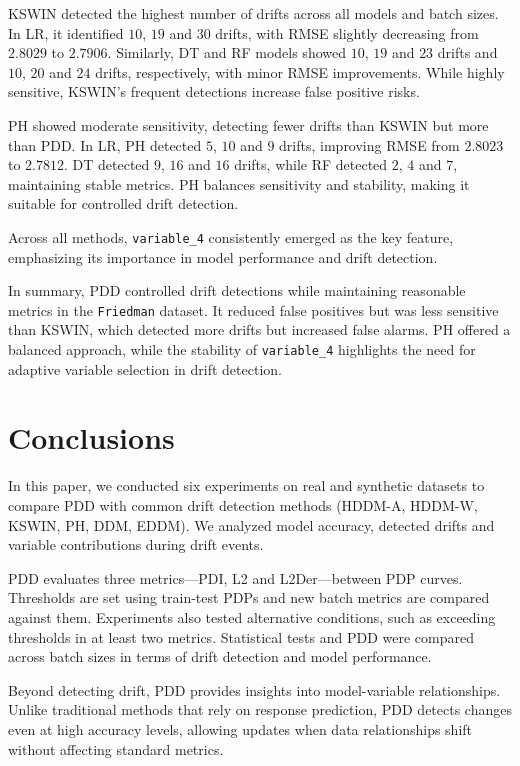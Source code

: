 KSWIN detected the highest number of drifts across all models and batch sizes. In LR, it identified \(10\), \(19\) and \(30\) drifts, with RMSE slightly decreasing from \(2.8029\) to \(2.7906\). Similarly, DT and RF models showed \(10\), \(19\) and \(23\) drifts and \(10\), \(20\) and \(24\) drifts, respectively, with minor RMSE improvements. While highly sensitive, KSWIN's frequent detections increase false positive risks.

PH showed moderate sensitivity, detecting fewer drifts than KSWIN but more than PDD. In LR, PH detected \(5\), \(10\) and \(9\) drifts, improving RMSE from \(2.8023\) to \(2.7812\). DT detected \(9\), \(16\) and \(16\) drifts, while RF detected \(2\), \(4\) and \(7\), maintaining stable metrics. PH balances sensitivity and stability, making it suitable for controlled drift detection.

Across all methods, \texttt{variable\_4} consistently emerged as the key feature, emphasizing its importance in model performance and drift detection.

In summary, PDD controlled drift detections while maintaining reasonable metrics in the \texttt{Friedman} dataset. It reduced false positives but was less sensitive than KSWIN, which detected more drifts but increased false alarms. PH offered a balanced approach, while the stability of \texttt{variable\_4} highlights the need for adaptive variable selection in drift detection.

\hypertarget{conclusions}{%
\section{Conclusions}\label{conclusions}}

In this paper, we conducted six experiments on real and synthetic datasets to compare PDD with common drift detection methods (HDDM-A, HDDM-W, KSWIN, PH, DDM, EDDM). We analyzed model accuracy, detected drifts and variable contributions during drift events.

PDD evaluates three metrics---PDI, L2 and L2Der---between PDP curves. Thresholds are set using train-test PDPs and new batch metrics are compared against them. Experiments also tested alternative conditions, such as exceeding thresholds in at least two metrics. Statistical tests and PDD were compared across batch sizes in terms of drift detection and model performance.

Beyond detecting drift, PDD provides insights into model-variable relationships. Unlike traditional methods that rely on response prediction, PDD detects changes even at high accuracy levels, allowing updates when data relationships shift without affecting standard metrics.

